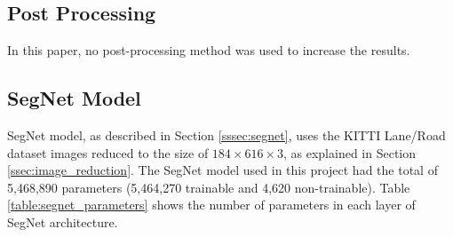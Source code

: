 \documentclass[10pt,twocolumn,letterpaper]{article}
\begin{document}
\subsection{Post Processing} \label{ssec:post_processing}

In this paper, no post-processing method was used to increase the results.

\subsection{SegNet Model} \label{ssec:segnet_model}

SegNet model, as described in Section \ref{sssec:segnet}, uses the KITTI Lane/Road dataset images reduced to the size of $ 184 \times 616 \times 3$, as explained in Section \ref{ssec:image_reduction}. The SegNet model used in this project had the total of 5,468,890 parameters (5,464,270 trainable and 4,620 non-trainable). Table \ref{table:segnet_parameters} shows the number of parameters in each layer of SegNet architecture.
\end{document}
